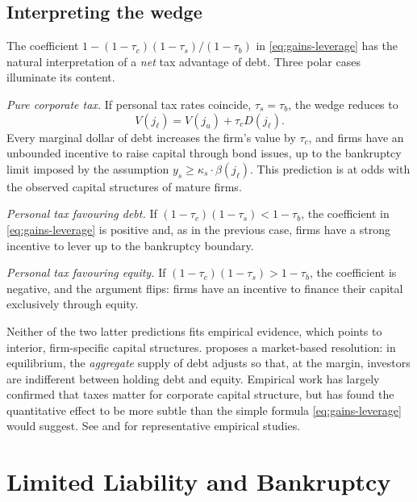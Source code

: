 \documentclass[11pt,a4paper,oneside]{book}
\def\geq{\geqslant}
\theoremstyle{plain}
\theoremstyle{definition}
\theoremstyle{remark}
\numberwithin{equation}{chapter}
\begin{document}
\subsection{Interpreting the wedge}

The coefficient $1 - (1-\tau_c)(1-\tau_s)/(1-\tau_b)$ in \eqref{eq:gains-leverage} has the natural interpretation of a \emph{net} tax advantage of debt.
Three polar cases illuminate its content.

\emph{Pure corporate tax.}
If personal tax rates coincide, $\tau_s = \tau_b$, the wedge reduces to
\begin{equation*}
  V(j_\ell) = V(j_u) + \tau_c D(j_\ell).
\end{equation*}
Every marginal dollar of debt increases the firm's value by $\tau_c$, and firms have an unbounded incentive to raise capital through bond issues, up to the bankruptcy limit imposed by the assumption $y_s \geq \kappa_s \cdot \beta(j_\ell)$.
This prediction is at odds with the observed capital structures of mature firms.

\emph{Personal tax favouring debt.}
If $(1-\tau_c)(1-\tau_s) < 1 - \tau_b$, the coefficient in \eqref{eq:gains-leverage} is positive and, as in the previous case, firms have a strong incentive to lever up to the bankruptcy boundary.

\emph{Personal tax favouring equity.}
If $(1-\tau_c)(1-\tau_s) > 1 - \tau_b$, the coefficient is negative, and the argument flips: firms have an incentive to finance their capital exclusively through equity.

Neither of the two latter predictions fits empirical evidence, which points to interior, firm-specific capital structures.
\citet{Miller1977} proposes a market-based resolution: in equilibrium, the \emph{aggregate} supply of debt adjusts so that, at the margin, investors are indifferent between holding debt and equity.
Empirical work has largely confirmed that taxes matter for corporate capital structure, but has found the quantitative effect to be more subtle than the simple formula \eqref{eq:gains-leverage} would suggest.
See \citet{MackieMason1990} and \citet{DesaiFoleyHines2004} for representative empirical studies.

\section{Limited Liability and Bankruptcy}
\label{sec:limited-liability}
\end{document}
